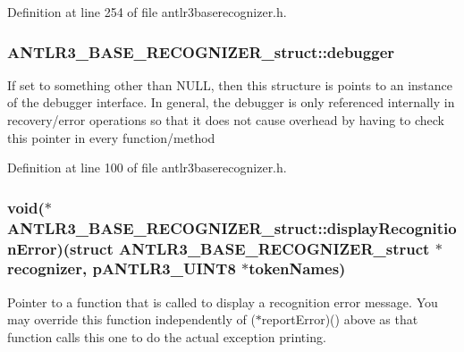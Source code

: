 Definition at line 254 of file antlr3baserecognizer.\-h.

\hypertarget{struct_a_n_t_l_r3___b_a_s_e___r_e_c_o_g_n_i_z_e_r__struct_a5c94b88fd42cac2bfc91648489bb81c0}{
\subsubsection[{debugger}]{ A\-N\-T\-L\-R3\-\_\-\-B\-A\-S\-E\-\_\-\-R\-E\-C\-O\-G\-N\-I\-Z\-E\-R\-\_\-struct\-::debugger}}\label{struct_a_n_t_l_r3___b_a_s_e___r_e_c_o_g_n_i_z_e_r__struct_a5c94b88fd42cac2bfc91648489bb81c0}
If set to something other than N\-U\-L\-L, then this structure is points to an instance of the debugger interface. In general, the debugger is only referenced internally in recovery/error operations so that it does not cause overhead by having to check this pointer in every function/method 

Definition at line 100 of file antlr3baserecognizer.\-h.

\hypertarget{struct_a_n_t_l_r3___b_a_s_e___r_e_c_o_g_n_i_z_e_r__struct_ab9e9f3d92b4a40a68a877c9689b60f99}{
\subsubsection[{display\-Recognition\-Error}]{\setlength{\rightskip}{0pt plus 5cm}void($\ast$ A\-N\-T\-L\-R3\-\_\-\-B\-A\-S\-E\-\_\-\-R\-E\-C\-O\-G\-N\-I\-Z\-E\-R\-\_\-struct\-::display\-Recognition\-Error)(struct {\bf A\-N\-T\-L\-R3\-\_\-\-B\-A\-S\-E\-\_\-\-R\-E\-C\-O\-G\-N\-I\-Z\-E\-R\-\_\-struct} $\ast${\bf recognizer}, {\bf p\-A\-N\-T\-L\-R3\-\_\-\-U\-I\-N\-T8} $\ast$token\-Names)}}\label{struct_a_n_t_l_r3___b_a_s_e___r_e_c_o_g_n_i_z_e_r__struct_ab9e9f3d92b4a40a68a877c9689b60f99}
Pointer to a function that is called to display a recognition error message. You may override this function independently of ($\ast$report\-Error)() above as that function calls this one to do the actual exception printing. 

